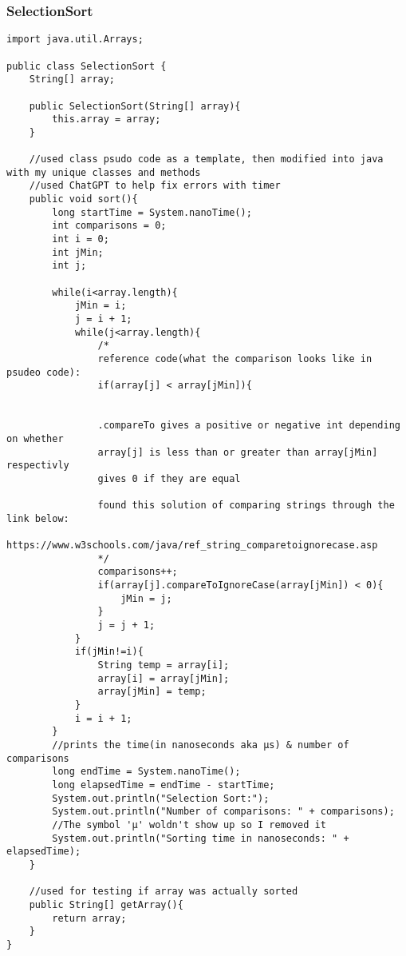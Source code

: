 \documentclass[10pt]{article}
\begin{document}
\subsubsection{SelectionSort}
\lstset{numbers=left, numberstyle=\tiny, stepnumber=1, numbersep=5pt, basicstyle=\footnotesize\ttfamily}
\begin{lstlisting}[frame=single, ]  
import java.util.Arrays;

public class SelectionSort {
    String[] array;

    public SelectionSort(String[] array){
        this.array = array;
    }

    //used class psudo code as a template, then modified into java with my unique classes and methods
    //used ChatGPT to help fix errors with timer
    public void sort(){
        long startTime = System.nanoTime();
        int comparisons = 0;
        int i = 0;
        int jMin;
        int j;

        while(i<array.length){
            jMin = i;
            j = i + 1;
            while(j<array.length){
                /*
                reference code(what the comparison looks like in psudeo code):
                if(array[j] < array[jMin]){


                .compareTo gives a positive or negative int depending on whether
                array[j] is less than or greater than array[jMin] respectivly
                gives 0 if they are equal

                found this solution of comparing strings through the link below:
                https://www.w3schools.com/java/ref_string_comparetoignorecase.asp
                */
                comparisons++;
                if(array[j].compareToIgnoreCase(array[jMin]) < 0){
                    jMin = j;
                }
                j = j + 1;
            }
            if(jMin!=i){
                String temp = array[i];
                array[i] = array[jMin];
                array[jMin] = temp;
            }
            i = i + 1;
        }
        //prints the time(in nanoseconds aka μs) & number of comparisons
        long endTime = System.nanoTime();
        long elapsedTime = endTime - startTime;
        System.out.println("Selection Sort:");
        System.out.println("Number of comparisons: " + comparisons);
        //The symbol 'μ' woldn't show up so I removed it
        System.out.println("Sorting time in nanoseconds: " + elapsedTime);
    }

    //used for testing if array was actually sorted
    public String[] getArray(){
        return array;
    }
}
\end{lstlisting}
\end{document}
